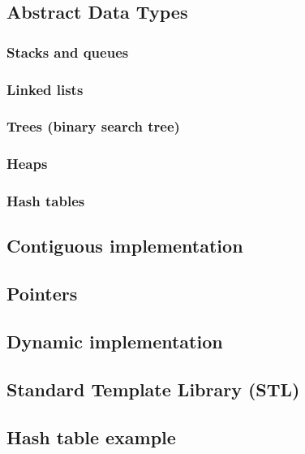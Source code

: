 \subsection{Abstract Data Types}

\subsubsection{Stacks and queues}

\subsubsection{Linked lists}

\subsubsection{Trees (binary search tree)}

\subsubsection{Heaps}

\subsubsection{Hash tables}

\subsection{Contiguous implementation}

\subsection{Pointers}

\subsection{Dynamic implementation}

\subsection{Standard Template Library (STL)}

\subsection{Hash table example}